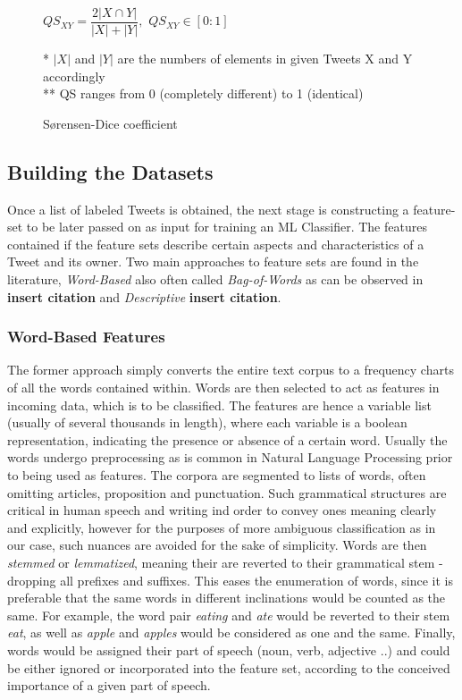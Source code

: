 		\begin{figure}[h]
			\begin{center}
				\label{fig:sorenson_dice}
				$QS_{XY} = \dfrac{2|X\cap Y|}{|X|+|Y|},$ \hspace{10pt}  $QS_{XY} \in [0:1]$
				\par
			\end{center}
			{\small
				* $|X|$ and $|Y|$ are the numbers of elements in given Tweets X and Y accordingly 
				\\
				** QS ranges from 0 (completely different) to 1 (identical)
				\caption{S\o rensen-Dice coefficient}
			}
		\end{figure}
		
		\newpage
		
	\subsection{Building the Datasets}
	\label{build_features}
	Once a list of labeled Tweets is obtained, the next stage is constructing a feature-set to be later passed on as input for training an ML Classifier. The features contained if the feature sets describe certain aspects and characteristics of a Tweet and its owner. Two main approaches to feature sets are found in the literature, \textit{Word-Based} also often called \textit{Bag-of-Words} as can be observed in \textbf{\color{red} insert citation} and \textit{Descriptive} \textbf{\color{red} insert citation}. 
	
		\subsubsection{Word-Based Features}
		The former approach simply converts the entire text corpus to a frequency charts of all the words contained within. Words are then selected to act as features in incoming data, which is to be classified. The features are hence a variable list (usually of several thousands in length), where each variable is a boolean representation, indicating the presence or absence of a certain word. Usually the words undergo preprocessing as is common in Natural Language Processing prior to being used as features. The corpora are segmented to lists of words, often omitting articles, proposition and punctuation. Such grammatical structures are critical in human speech and writing ind order to convey ones meaning clearly and explicitly, however for the purposes of more ambiguous classification as in our case, such nuances are avoided for the sake of simplicity. Words are then \textit{stemmed} or \textit{lemmatized}, meaning their are reverted to their grammatical stem - dropping all prefixes and suffixes. This eases the enumeration of words, since it is preferable that the same words in different inclinations would be counted as the same. For example, the word pair \textit{eating} and \textit{ate} would be reverted to their stem \textit{eat}, as well as \textit{apple} and \textit{apples} would be considered as one and the same. Finally, words would be assigned their part of speech (noun, verb, adjective ..) and could be either ignored or incorporated into the feature set, according to the conceived importance of a given part of speech.
		
